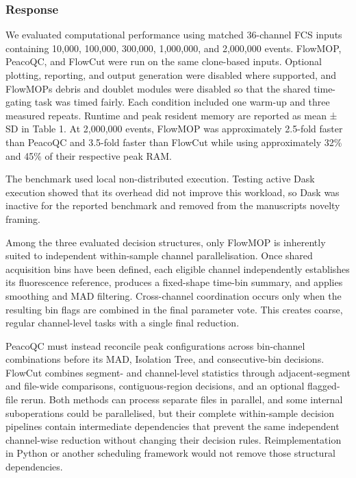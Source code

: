 \documentclass[
  11pt,
  a4paper,
]{article}
\begin{document}
\subsubsection{Response}\label{response-1}

We evaluated computational performance using matched 36-channel FCS
inputs containing 10,000, 100,000, 300,000, 1,000,000, and 2,000,000
events. FlowMOP, PeacoQC, and FlowCut were run on the same clone-based
inputs. Optional plotting, reporting, and output generation were
disabled where supported, and FlowMOP\textquotesingle s debris and
doublet modules were disabled so that the shared time-gating task was
timed fairly. Each condition included one warm-up and three measured
repeats. Runtime and peak resident memory are reported as mean ± SD in
Table 1. At 2,000,000 events, FlowMOP was approximately 2.5-fold faster
than PeacoQC and 3.5-fold faster than FlowCut while using approximately
32\% and 45\% of their respective peak RAM.

The benchmark used local non-distributed execution. Testing active Dask
execution showed that its overhead did not improve this workload, so
Dask was inactive for the reported benchmark and removed from the
manuscript\textquotesingle s novelty framing.

Among the three evaluated decision structures, only FlowMOP is
inherently suited to independent within-sample channel parallelisation.
Once shared acquisition bins have been defined, each eligible channel
independently establishes its fluorescence reference, produces a
fixed-shape time-bin summary, and applies smoothing and MAD filtering.
Cross-channel coordination occurs only when the resulting bin flags are
combined in the final parameter vote. This creates coarse, regular
channel-level tasks with a single final reduction.

PeacoQC must instead reconcile peak configurations across bin-channel
combinations before its MAD, Isolation Tree, and consecutive-bin
decisions. FlowCut combines segment- and channel-level statistics
through adjacent-segment and file-wide comparisons, contiguous-region
decisions, and an optional flagged-file rerun. Both methods can process
separate files in parallel, and some internal suboperations could be
parallelised, but their complete within-sample decision pipelines
contain intermediate dependencies that prevent the same independent
channel-wise reduction without changing their decision rules.
Reimplementation in Python or another scheduling framework would not
remove those structural dependencies.
\end{document}

